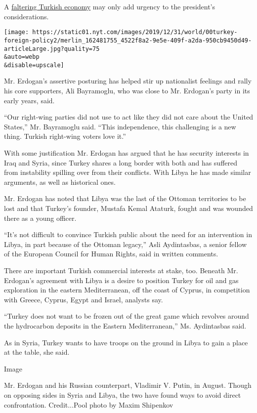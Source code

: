 A
\href{https://www.nytimes.com/2019/07/08/business/turkey-economy-crisis.html}{faltering
Turkish economy} may only add urgency to the president's considerations.

\texttt{[image: https://static01.nyt.com/images/2019/12/31/world/00turkey-foreign-policy2/merlin\_162481755\_4522f8a2-9e5e-409f-a2da-950cb9450d49-articleLarge.jpg?quality=75\\\&auto=webp\\\&disable=upscale]}

Mr. Erdogan's assertive posturing has helped stir up nationalist
feelings and rally his core supporters, Ali Bayramoglu, who was close to
Mr. Erdogan's party in its early years, said.

``Our right-wing parties did not use to act like they did not care about
the United States,'' Mr. Bayramoglu said. ``This independence, this
challenging is a new thing. Turkish right-wing voters love it.''

With some justification Mr. Erdogan has argued that he has security
interests in Iraq and Syria, since Turkey shares a long border with both
and has suffered from instability spilling over from their conflicts.
With Libya he has made similar arguments, as well as historical ones.

Mr. Erdogan has noted that Libya was the last of the Ottoman territories
to be lost and that Turkey's founder, Mustafa Kemal Ataturk, fought and
was wounded there as a young officer.

``It's not difficult to convince Turkish public about the need for an
intervention in Libya, in part because of the Ottoman legacy,'' Asli
Aydintasbas, a senior fellow of the European Council for Human Rights,
said in written comments.

There are important Turkish commercial interests at stake, too. Beneath
Mr. Erdogan's agreement with Libya is a desire to position Turkey for
oil and gas exploration in the eastern Mediterranean, off the coast of
Cyprus, in competition with Greece, Cyprus, Egypt and Israel, analysts
say.

``Turkey does not want to be frozen out of the great game which revolves
around the hydrocarbon deposits in the Eastern Mediterranean,'' Ms.
Aydintasbas said.

As in Syria, Turkey wants to have troops on the ground in Libya to gain
a place at the table, she said.

Image

Mr. Erdogan and his Russian counterpart, Vladimir V. Putin, in August.
Though on opposing sides in Syria and Libya, the two have found ways to
avoid direct confrontation. Credit...Pool photo by Maxim Shipenkov


